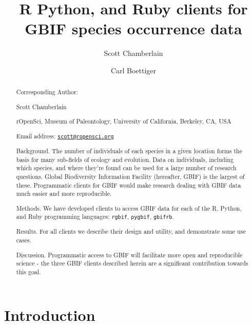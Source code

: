 \documentclass[author-year, review, 11pt]{components/elsarticle} %
\begin{document}
\begin{frontmatter}

  \title{R Python, and Ruby clients for GBIF species occurrence data}
    \author[cstar]{Scott Chamberlain}
    \author[boettig]{Carl Boettiger}
  
      \address[cstar]{rOpenSci, Museum of Paleontology, University of California, Berkeley,
CA, USA}
    \address[boettig]{rOpenSci, Department of Enivornmental Science, Policy and Management,
University of California, Berkeley, CA, USA}
  
  \begin{abstract}
  Corresponding Author:
  
  Scott Chamberlain
  
  rOpenSci, Museum of Paleontology, University of California, Berkeley,
  CA, USA
  
  Email address:
  \href{mailto:scott@ropensci.org}{\nolinkurl{scott@ropensci.org}}
  
  \newpage
  
  Background. The number of individuals of each species in a given
  location forms the basis for many sub-fields of ecology and evolution.
  Data on individuals, including which species, and where they're found
  can be used for a large number of research questions. Global
  Biodiversity Information Facility (hereafter, GBIF) is the largest of
  these. Programmatic clients for GBIF would make research dealing with
  GBIF data much easier and more reproducible.
  
  Methods. We have developed clients to access GBIF data for each of the
  R, Python, and Ruby programming languages: \texttt{rgbif},
  \texttt{pygbif}, \texttt{gbifrb}.
  
  Results. For all clients we describe their design and utility, and
  demonstrate some use cases.
  
  Discussion. Programmatic access to GBIF will facilitate more open and
  reproducible science - the three GBIF clients described herein are a
  significant contribution towards this goal.
  \end{abstract}
  
 \end{frontmatter}


\newpage

\section{Introduction}\label{introduction}
\end{document}
